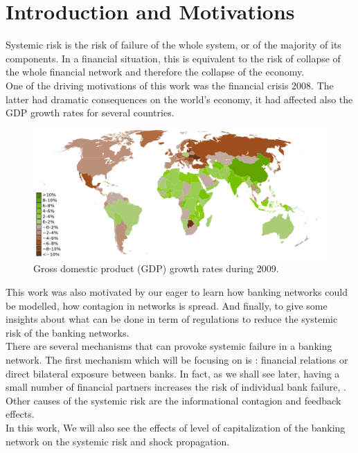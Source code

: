 \documentclass[14pt]{article}
\begin{document}
\section{Introduction and Motivations}

Systemic risk is the risk of failure of the whole system, or of the majority of its components. In a financial situation, this is equivalent to the risk of collapse of the whole financial network and therefore the collapse of the economy.
\\ One of the driving motivations of this work was the financial crisis 2008. The latter had dramatic consequences on the world's economy, it had affected also the GDP growth rates for several countries.

\begin{figure}[h]
\begin{center}
  \includegraphics[width=0.98\linewidth]{img/fig1.png}
  \caption{Gross domestic product (GDP) growth rates during 2009\cite{Wiki}.}
  \label{fig:1}
  \end{center}
\end{figure}

This work was also motivated by our eager to learn how banking networks could be modelled, how contagion in networks is spread. And finally, to give some insights about what can be done in term of regulations to reduce the systemic risk of the banking networks.
\\ There are several mechanisms that can provoke systemic failure in a banking network. The first mechanism which will be focusing on is : financial relations or direct bilateral exposure between banks\cite{art1}. In fact, as we shall see later, having a small number of financial partners increases the risk of individual bank failure, . 
\\Other causes of the systemic risk are the informational contagion and feedback effects.
\\In this work, We will also see the effects of level of capitalization of the banking network on the systemic risk and shock propagation.
\end{document}
